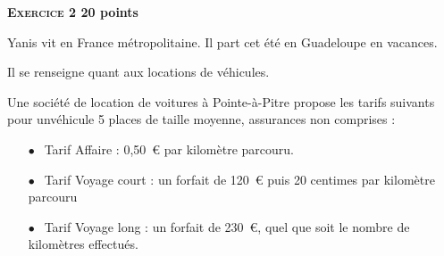 \textbf{{\large \textsc{Exercice 2}} \hfill 20 points}

\bigskip

Yanis vit en France métropolitaine. Il part cet été en Guadeloupe en vacances.

Il se renseigne quant aux locations de véhicules.

Une société de location de voitures à Pointe-à-Pitre propose les tarifs suivants pour unvéhicule  5 places de taille moyenne,  assurances non comprises :

\begin{itemize}
\item[$\bullet~~$]Tarif \og Affaire \fg{} : 0,50~\euro{} par kilomètre parcouru.
\item[$\bullet~~$]Tarif \og Voyage court \fg{} : un forfait de 120~\euro{} puis 20 centimes par 
kilomètre parcouru
\item[$\bullet~~$]Tarif \og Voyage long \fg : un forfait de 230~\euro, quel que soit le nombre de kilomètres effectués.
\end{itemize}

\medskip

